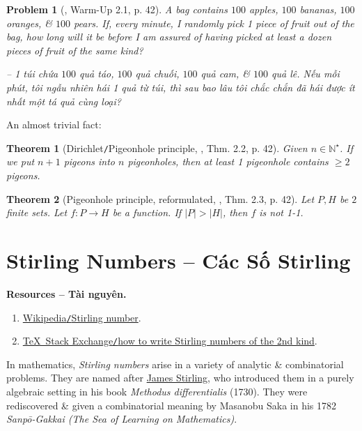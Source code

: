 \documentclass[oneside]{book}
\newtheorem{problem}{Problem}
\newtheorem{theorem}{Theorem}
\begin{document}
\begin{problem}[\cite{Shahriari2022}, Warm-Up 2.1, p. 42]
	A bag contains $100$ apples, $100$ bananas, $100$ oranges, \& $100$ pears. If, every minute, I randomly pick 1 piece of fruit out of the bag, how long will it be before I am assured of having picked at least a dozen pieces of fruit of the same kind?
	
	-- 1 túi chứa $100$ quả táo, $100$ quả chuối, $100$ quả cam, \& $100$ quả lê. Nếu mỗi phút, tôi ngẫu nhiên hái 1 quả từ túi, thì sau bao lâu tôi chắc chắn đã hái được ít nhất một tá quả cùng loại?
\end{problem}
An almost trivial fact:

\begin{theorem}[Dirichlet{\tt/}Pigeonhole principle, \cite{Shahriari2022}, Thm. 2.2, p. 42]
	Given $n\in\mathbb{N}^\star$. If we put $n + 1$ pigeons into $n$ pigeonholes, then at least 1 pigeonhole contains $\ge2$ pigeons.
\end{theorem}

\begin{theorem}[Pigeonhole principle, reformulated, \cite{Shahriari2022}, Thm. 2.3, p. 42]
	Let $P,H$ be $2$ finite sets. Let $f:P\to H$ be a function. If $|P| > |H|$, then $f$ is not 1-1.
\end{theorem}


\section{Stirling Numbers -- Các Số Stirling}
\textbf{\textsf{Resources -- Tài nguyên.}}
\begin{enumerate}
	\item \href{https://en.wikipedia.org/wiki/Stirling_number}{Wikipedia{\tt/}Stirling number}.
	\item \href{https://tex.stackexchange.com/questions/86056/how-to-write-stirling-numbers-of-the-second-kind}{\TeX\ Stack Exchange{\tt/}how to write Stirling numbers of the 2nd kind}.
\end{enumerate}
In mathematics, {\it Stirling numbers} arise in a variety of analytic \& combinatorial problems. They are named after \href{https://en.wikipedia.org/wiki/James_Stirling_(mathematician)}{\sc James Stirling}, who introduced them in a purely algebraic setting in his book {\it Methodus differentialis} (1730). They were rediscovered \& given a combinatorial meaning by {\sc Masanobu Saka} in his 1782 {\it Sanpō-Gakkai (The Sea of Learning on Mathematics)}.
\end{document}
